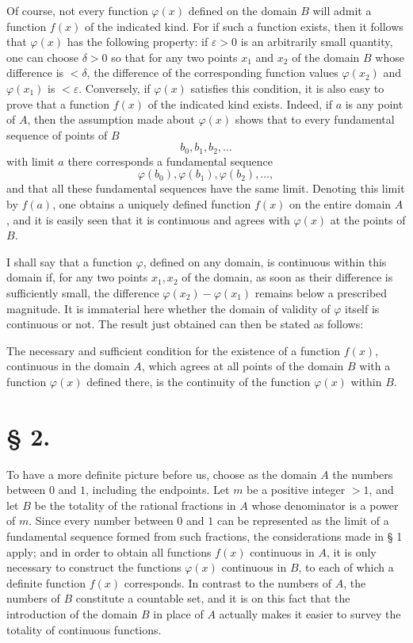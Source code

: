 \documentclass[11pt,a4paper]{article}
\begin{document}
Of course, not every function $\varphi(x)$ defined on the domain $B$ will admit a function $f(x)$ of the indicated kind. For if such a function exists, then it follows that $\varphi(x)$ has the following property: if $\varepsilon>0$ is an arbitrarily small quantity, one can choose $\delta>0$ so that for any two points $x_1$ and $x_2$ of the domain $B$ whose difference is $<\delta$, the difference of the corresponding function values $\varphi(x_2)$ and $\varphi(x_1)$ is $<\varepsilon$. Conversely, if $\varphi(x)$ satisfies this condition, it is also easy to prove that a function $f(x)$ of the indicated kind exists. Indeed, if $a$ is any point of $A$, then the assumption made about $\varphi(x)$ shows that to every fundamental sequence of points of $B$
\[
 b_0,b_1,b_2,\ldots
\]
with limit $a$ there corresponds a fundamental sequence
\[
 \varphi(b_0),\varphi(b_1),\varphi(b_2),\ldots,
\]
and that all these fundamental sequences have the same limit. Denoting this limit by $f(a)$, one obtains a uniquely defined function $f(x)$ on the entire domain $A$, and it is easily seen that it is continuous and agrees with $\varphi(x)$ at the points of $B$.

I shall say that a function $\varphi$, defined on any domain, is continuous within this domain if, for any two points $x_1,x_2$ of the domain, as soon as their difference is sufficiently small, the difference $\varphi(x_2)-\varphi(x_1)$ remains below a prescribed magnitude. It is immaterial here whether the domain of validity of $\varphi$ itself is continuous or not. The result just obtained can then be stated as follows:

The necessary and sufficient condition for the existence of a function $f(x)$, continuous in the domain $A$, which agrees at all points of the domain $B$ with a function $\varphi(x)$ defined there, is the continuity of the function $\varphi(x)$ within $B$.

\section*{§ 2.}

To have a more definite picture before us, choose as the domain $A$ the numbers between $0$ and $1$, including the endpoints. Let $m$ be a positive integer $>1$, and let $B$ be the totality of the rational fractions in $A$ whose denominator is a power of $m$. Since every number between $0$ and $1$ can be represented as the limit of a fundamental sequence formed from such fractions, the considerations made in § 1 apply; and in order to obtain all functions $f(x)$ continuous in $A$, it is only necessary to construct the functions $\varphi(x)$ continuous in $B$, to each of which a definite function $f(x)$ corresponds. In contrast to the numbers of $A$, the numbers of $B$ constitute a countable set, and it is on this fact that the introduction of the domain $B$ in place of $A$ actually makes it easier to survey the totality of continuous functions.
\end{document}
